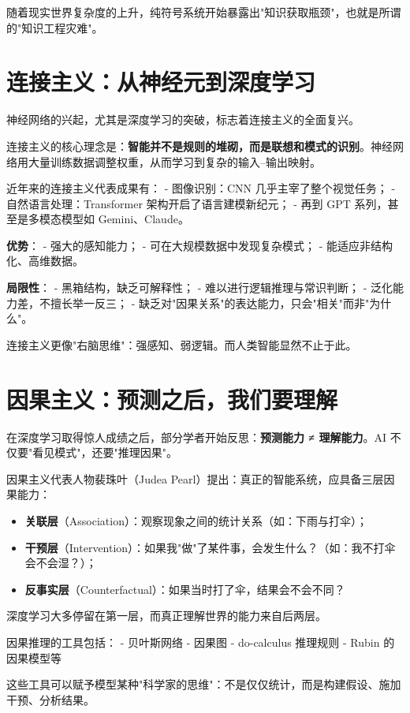 随着现实世界复杂度的上升，纯符号系统开始暴露出"知识获取瓶颈"，也就是所谓的"知识工程灾难"。

\section*{连接主义：从神经元到深度学习}

神经网络的兴起，尤其是深度学习的突破，标志着连接主义的全面复兴。

连接主义的核心理念是：\textbf{智能并不是规则的堆砌，而是联想和模式的识别}。神经网络用大量训练数据调整权重，从而学习到复杂的输入–输出映射。

近年来的连接主义代表成果有：
- 图像识别：CNN 几乎主宰了整个视觉任务；
- 自然语言处理：Transformer 架构开启了语言建模新纪元；
- 再到 GPT 系列，甚至是多模态模型如 Gemini、Claude。

\textbf{优势}：
- 强大的感知能力；
- 可在大规模数据中发现复杂模式；
- 能适应非结构化、高维数据。

\textbf{局限性}：
- 黑箱结构，缺乏可解释性；
- 难以进行逻辑推理与常识判断；
- 泛化能力差，不擅长举一反三；
- 缺乏对"因果关系"的表达能力，只会"相关"而非"为什么"。

连接主义更像"右脑思维"：强感知、弱逻辑。而人类智能显然不止于此。

\section*{因果主义：预测之后，我们要理解}

在深度学习取得惊人成绩之后，部分学者开始反思：\textbf{预测能力 ≠ 理解能力}。AI 不仅要"看见模式"，还要"推理因果"。

因果主义代表人物裴珠叶（Judea Pearl）提出：真正的智能系统，应具备三层因果能力：
\begin{itemize}
\item \textbf{关联层}（Association）：观察现象之间的统计关系（如：下雨与打伞）；
\item \textbf{干预层}（Intervention）：如果我"做"了某件事，会发生什么？（如：我不打伞会不会湿？）；
\item \textbf{反事实层}（Counterfactual）：如果当时打了伞，结果会不会不同？
\end{itemize}

深度学习大多停留在第一层，而真正理解世界的能力来自后两层。

因果推理的工具包括：
- 贝叶斯网络
- 因果图
- do-calculus 推理规则
- Rubin 的因果模型等

这些工具可以赋予模型某种"科学家的思维"：不是仅仅统计，而是构建假设、施加干预、分析结果。

